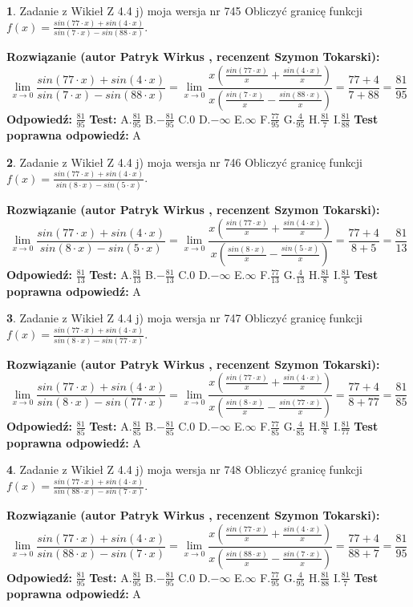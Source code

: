 \documentclass[12pt, a4paper]{article}
\theoremstyle{definition} %
\newtheorem{zad}{}
\newcommand{\zadStart}[1]{\begin{zad}#1\newline}
\newcommand{\zadStop}{\end{zad}}
\newcommand{\rozwStart}[2]{\noindent \textbf{Rozwiązanie (autor #1 , recenzent #2): }\newline}
\newcommand{\rozwStop}{\newline}
\newcommand{\odpStart}{\noindent \textbf{Odpowiedź:}\newline}
\newcommand{\odpStop}{\newline}
\newcommand{\testStart}{\noindent \textbf{Test:}\newline}
\newcommand{\testStop}{\newline}
\newcommand{\kluczStart}{\noindent \textbf{Test poprawna odpowiedź:}\newline}
\newcommand{\kluczStop}{\newline}
\begin{document}
\zadStart{Zadanie z Wikieł Z 4.4 j) moja wersja nr 745}
Obliczyć granicę funkcji $f(x)=\frac{sin(77\cdot x) +sin(4\cdot x)}{sin(7\cdot x) -sin(88\cdot x)}$.
\zadStop
\rozwStart{Patryk Wirkus}{Szymon Tokarski}
$$\lim\limits_{x\to 0}\frac{sin(77\cdot x) +sin(4\cdot x)}{sin(7\cdot x) -sin(88\cdot x)}=\lim\limits_{x\to 0}\frac{x(\frac{sin(77\cdot x)}{x}+\frac{sin(4\cdot x)}{x})}{x(\frac{sin(7\cdot x)}{x}-\frac{sin(88\cdot x)}{x})}=\frac{77+4}{7+88} = \frac{81}{95}$$
\rozwStop
\odpStart
$\frac{81}{95}$
\odpStop
\testStart
A.$\frac{81}{95}$
B.$-\frac{81}{95}$
C.$0$
D.$-\infty$
E.$\infty$
F.$\frac{77}{95}$
G.$\frac{4}{95}$
H.$\frac{81}{7}$
I.$\frac{81}{88}$
\testStop
\kluczStart
A
\kluczStop



\zadStart{Zadanie z Wikieł Z 4.4 j) moja wersja nr 746}
Obliczyć granicę funkcji $f(x)=\frac{sin(77\cdot x) +sin(4\cdot x)}{sin(8\cdot x) -sin(5\cdot x)}$.
\zadStop
\rozwStart{Patryk Wirkus}{Szymon Tokarski}
$$\lim\limits_{x\to 0}\frac{sin(77\cdot x) +sin(4\cdot x)}{sin(8\cdot x) -sin(5\cdot x)}=\lim\limits_{x\to 0}\frac{x(\frac{sin(77\cdot x)}{x}+\frac{sin(4\cdot x)}{x})}{x(\frac{sin(8\cdot x)}{x}-\frac{sin(5\cdot x)}{x})}=\frac{77+4}{8+5} = \frac{81}{13}$$
\rozwStop
\odpStart
$\frac{81}{13}$
\odpStop
\testStart
A.$\frac{81}{13}$
B.$-\frac{81}{13}$
C.$0$
D.$-\infty$
E.$\infty$
F.$\frac{77}{13}$
G.$\frac{4}{13}$
H.$\frac{81}{8}$
I.$\frac{81}{5}$
\testStop
\kluczStart
A
\kluczStop



\zadStart{Zadanie z Wikieł Z 4.4 j) moja wersja nr 747}
Obliczyć granicę funkcji $f(x)=\frac{sin(77\cdot x) +sin(4\cdot x)}{sin(8\cdot x) -sin(77\cdot x)}$.
\zadStop
\rozwStart{Patryk Wirkus}{Szymon Tokarski}
$$\lim\limits_{x\to 0}\frac{sin(77\cdot x) +sin(4\cdot x)}{sin(8\cdot x) -sin(77\cdot x)}=\lim\limits_{x\to 0}\frac{x(\frac{sin(77\cdot x)}{x}+\frac{sin(4\cdot x)}{x})}{x(\frac{sin(8\cdot x)}{x}-\frac{sin(77\cdot x)}{x})}=\frac{77+4}{8+77} = \frac{81}{85}$$
\rozwStop
\odpStart
$\frac{81}{85}$
\odpStop
\testStart
A.$\frac{81}{85}$
B.$-\frac{81}{85}$
C.$0$
D.$-\infty$
E.$\infty$
F.$\frac{77}{85}$
G.$\frac{4}{85}$
H.$\frac{81}{8}$
I.$\frac{81}{77}$
\testStop
\kluczStart
A
\kluczStop



\zadStart{Zadanie z Wikieł Z 4.4 j) moja wersja nr 748}
Obliczyć granicę funkcji $f(x)=\frac{sin(77\cdot x) +sin(4\cdot x)}{sin(88\cdot x) -sin(7\cdot x)}$.
\zadStop
\rozwStart{Patryk Wirkus}{Szymon Tokarski}
$$\lim\limits_{x\to 0}\frac{sin(77\cdot x) +sin(4\cdot x)}{sin(88\cdot x) -sin(7\cdot x)}=\lim\limits_{x\to 0}\frac{x(\frac{sin(77\cdot x)}{x}+\frac{sin(4\cdot x)}{x})}{x(\frac{sin(88\cdot x)}{x}-\frac{sin(7\cdot x)}{x})}=\frac{77+4}{88+7} = \frac{81}{95}$$
\rozwStop
\odpStart
$\frac{81}{95}$
\odpStop
\testStart
A.$\frac{81}{95}$
B.$-\frac{81}{95}$
C.$0$
D.$-\infty$
E.$\infty$
F.$\frac{77}{95}$
G.$\frac{4}{95}$
H.$\frac{81}{88}$
I.$\frac{81}{7}$
\testStop
\kluczStart
A
\kluczStop
\end{document}
